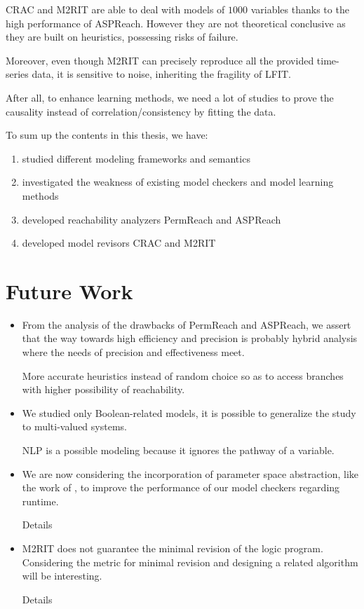 CRAC and M2RIT are able to deal with models of $1000$ variables thanks to the high performance of ASPReach.
However they are not theoretical conclusive as they are built on heuristics, possessing risks of failure.

Moreover, even though M2RIT can precisely reproduce all the provided time-series data, it is sensitive to noise, inheriting the fragility of LFIT.

After all, to enhance learning methods, we need a lot of studies to prove the causality instead of correlation/consistency by fitting the data.

To sum up the contents in this thesis, we have:

\begin{enumerate}
    \item studied different modeling frameworks and semantics
    \item investigated the weakness of existing model checkers and model learning methods
    \item developed reachability analyzers PermReach and ASPReach
    \item developed model revisors CRAC and M2RIT
\end{enumerate}

\section{Future Work}

\begin{itemize}
    \item From the analysis of the drawbacks of PermReach and ASPReach, we assert that the way towards high efficiency and precision is probably hybrid analysis where the needs of precision and effectiveness meet.
    
    More accurate heuristics instead of random choice so as to access branches with higher possibility of reachability.

    \item We studied only Boolean-related models, it is possible to generalize the study to multi-valued systems.
    
    NLP is a possible modeling because it ignores the pathway of a variable.
    
    \item We are now considering the incorporation of parameter space abstraction, like the work of \cite{PRNs-TCS18}, to
    improve the performance of our model checkers regarding runtime.
    
    Details
    
    
    \item M2RIT does not guarantee the minimal revision of the logic program.
    Considering the metric for minimal revision and designing a related algorithm will be interesting.
    
    Details
\end{itemize}
